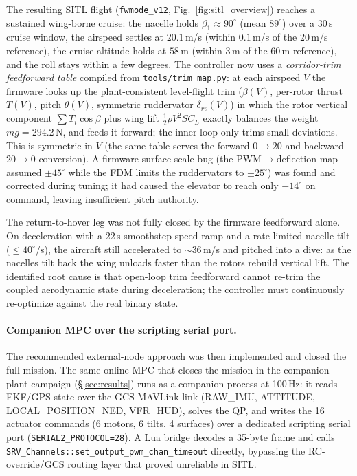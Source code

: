\documentclass[preprint,3p,11pt]{elsarticle}
\begin{document}
The resulting SITL flight (\texttt{fwmode\_v12}, Fig.~\ref{fig:sitl_overview})
reaches a sustained wing-borne cruise: the nacelle holds
$\beta_1\approx90^\circ$ (mean $89^\circ$) over a $30$\,s cruise window, the
airspeed settles at $20.1$\,m/s (within $0.1$\,m/s of the 20\,m/s reference),
the cruise altitude holds at $58$\,m (within $3$\,m of the 60\,m reference), and
the roll stays within a few degrees. The controller now uses a
\emph{corridor-trim feedforward table} compiled from \texttt{tools/trim\_map.py}:
at each airspeed $V$ the firmware looks up the plant-consistent level-flight trim
($\beta(V)$, per-rotor thrust $T(V)$, pitch $\theta(V)$, symmetric ruddervator
$\delta_{rv}(V)$) in which the rotor vertical component $\sum T_i\cos\beta$ plus
wing lift $\tfrac12\rho V^2 S C_L$ exactly balances the weight $mg=294.2$\,N, and
feeds it forward; the inner loop only trims small deviations. This is symmetric
in $V$ (the same table serves the forward $0\to20$ and backward $20\to0$
conversion). A firmware surface-scale bug (the PWM$\to$deflection map assumed
$\pm45^\circ$ while the FDM limits the ruddervators to $\pm25^\circ$) was found
and corrected during tuning; it had caused the elevator to reach only $-14^\circ$
on command, leaving insufficient pitch authority.

The return-to-hover leg was not fully closed by the firmware feedforward alone.
On deceleration with a 22\,s smoothstep speed ramp and a rate-limited nacelle
tilt ($\le40^\circ$/s), the aircraft still accelerated to $\sim$36\,m/s and
pitched into a dive: as the nacelles tilt back the wing unloads faster than the
rotors rebuild vertical lift. The identified root cause is that open-loop trim
feedforward cannot re-trim the coupled aerodynamic state during deceleration;
the controller must continuously re-optimize against the real binary state.

\paragraph{Companion MPC over the scripting serial port.}
The recommended external-node approach was then implemented and closed the full
mission. The same online MPC that closes the mission in the companion-plant
campaign (\S\ref{sec:results}) runs as a companion process at 100\,Hz: it reads
EKF/GPS state over the GCS MAVLink link (RAW\_IMU, ATTITUDE, LOCAL\_POSITION\_NED,
VFR\_HUD), solves the QP, and writes the 16 actuator commands (6 motors, 6
tilts, 4 surfaces) over a dedicated scripting serial port
(\texttt{SERIAL2\_PROTOCOL=28}). A Lua bridge decodes a 35-byte frame and calls
\texttt{SRV\_Channels::set\_output\_pwm\_chan\_timeout} directly, bypassing the
RC-override/GCS routing layer that proved unreliable in SITL.
\end{document}
